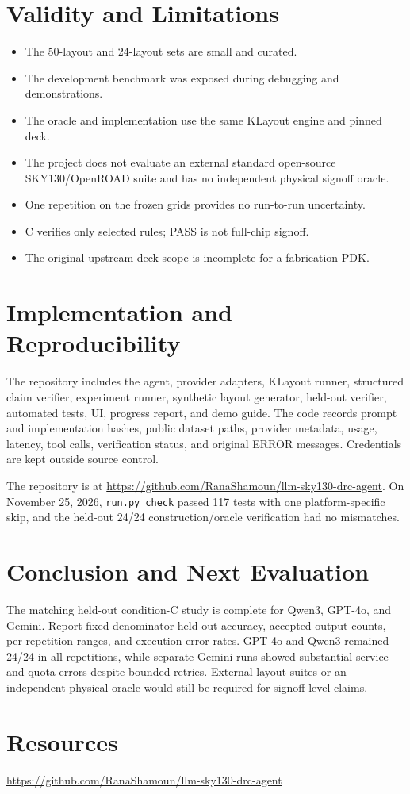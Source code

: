 \documentclass[10pt,twocolumn]{article}
\begin{document}
\section{Validity and Limitations}
\begin{itemize}[leftmargin=*]
\item The 50-layout and 24-layout sets are small and curated.
\item The development benchmark was exposed during debugging and demonstrations.
\item The oracle and implementation use the same KLayout engine and pinned deck.
\item The project does not evaluate an external standard open-source SKY130/OpenROAD
suite and has no independent physical signoff oracle.
\item One repetition on the frozen grids provides no run-to-run uncertainty.
\item C verifies only selected rules; PASS is not full-chip signoff.
\item The original upstream deck scope is incomplete for a fabrication PDK.
\end{itemize}

\section{Implementation and Reproducibility}
The repository includes the agent, provider adapters, KLayout runner, structured
claim verifier, experiment runner, synthetic layout generator, held-out verifier,
automated tests, UI, progress report, and demo guide. The code records prompt and
implementation hashes, public dataset paths, provider metadata, usage, latency,
tool calls, verification status, and original ERROR messages. Credentials are kept
outside source control.

The repository is at
\url{https://github.com/RanaShamoun/llm-sky130-drc-agent}.
On November 25, 2026, \texttt{run.py check} passed 117 tests with one platform-specific skip,
and the held-out 24/24 construction/oracle verification had no mismatches.

\section{Conclusion and Next Evaluation}
The matching held-out condition-C study is complete for Qwen3, GPT-4o, and Gemini.
Report fixed-denominator held-out accuracy, accepted-output counts, per-repetition
ranges, and execution-error rates. GPT-4o and Qwen3 remained 24/24 in all repetitions,
while separate Gemini runs showed substantial service and quota errors despite
bounded retries. External layout suites or an independent physical oracle
would still be required for signoff-level claims.

\section*{Resources}
\url{https://github.com/RanaShamoun/llm-sky130-drc-agent}
\end{document}
